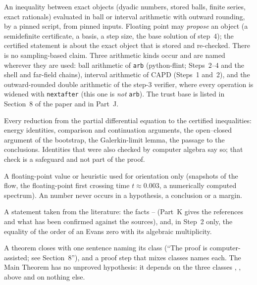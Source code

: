 \begin{description}[leftmargin=2.2em,style=nextline]
\item[\tcert{} certified.] An inequality between exact objects (dyadic numbers, stored balls, finite series, exact rationals) evaluated in ball or interval arithmetic with outward rounding, by a pinned script, from pinned inputs. Floating point may \emph{propose} an object (a semidefinite certificate, a basis, a step size, the base solution of step~4); the certified statement is about the exact object that is stored and re-checked. There is no sampling-based claim. Three arithmetic kinds occur and are named wherever they are used: ball arithmetic of \texttt{arb} (python-flint; Steps~2--4 and the shell and far-field chains), interval arithmetic of CAPD (Steps~1 and~2), and the outward-rounded double arithmetic of the step-3 verifier, where every operation is widened with \texttt{nextafter} (this one is \emph{not} \texttt{arb}). The trust base is listed in Section~8 of the paper and in Part~J.
\item[\thand{} proved by hand.] Every reduction from the partial differential equation to the certified inequalities: energy identities, comparison and continuation arguments, the open--closed argument of the bootstrap, the Galerkin-limit lemma, the passage to the conclusions. Identities that were also checked by computer algebra say so; that check is a safeguard and not part of the proof.
\item[\test{} estimate.] A floating-point value or heuristic used for orientation only (snapshots of the flow, the floating-point first crossing time $t\approx0.003$, a numerically computed spectrum). An \test{} number never occurs in a hypothesis, a conclusion or a margin.
\item[\tlit{} cited.] A statement taken from the literature: the facts -- (Part~K gives the references and what has been confirmed against the sources), and, in Step~2 only, the equality of the order of an Evans zero with its algebraic multiplicity.
\end{description}
\noindent A theorem closes with one sentence naming its class (``The proof is computer-assisted; see Section~8''), and a proof step that mixes classes names each. The Main Theorem has no unproved hypothesis: it depends on the three classes \tcert, \thand, \tlit{} above and on nothing else.

